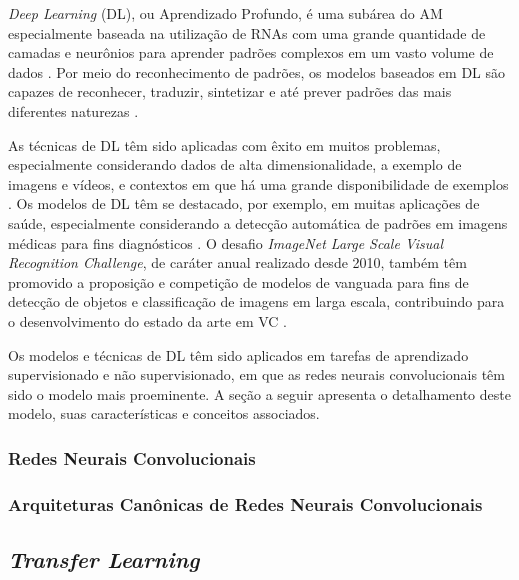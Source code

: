 \emph{Deep Learning} (DL), ou Aprendizado Profundo, é uma subárea do AM especialmente baseada na utilização de RNAs com uma grande quantidade de camadas e neurônios para aprender padrões complexos em um vasto volume de dados \cite{ref:chollet,ref:khan,ref:gulli}. Por meio do reconhecimento de padrões, os modelos baseados em DL são capazes de reconhecer, traduzir, sintetizar e até prever padrões das mais diferentes naturezas \cite{ref:JAI-2017}.

As técnicas de DL têm sido aplicadas com êxito em muitos problemas, especialmente considerando dados de alta dimensionalidade, a exemplo de imagens e vídeos, e contextos em que há uma grande disponibilidade de exemplos  \cite{ref:JAI-2017,ref:khan}. Os modelos de DL têm se destacado, por exemplo, em muitas aplicações de saúde, especialmente considerando a detecção automática de padrões em imagens médicas para fins diagnósticos \cite{ref:yang}. O desafio
\emph{ImageNet Large Scale Visual Recognition Challenge}, de caráter anual realizado desde 2010, também têm promovido a proposição e competição de modelos de vanguada para fins de detecção de objetos e classificação de imagens em larga escala, contribuindo para o desenvolvimento do estado da arte em VC \cite{ref:image-net}.

Os modelos e técnicas de DL têm sido aplicados em tarefas de aprendizado supervisionado e não supervisionado, em que as redes neurais convolucionais têm sido o modelo mais proeminente. A seção a seguir apresenta o detalhamento deste modelo, suas características e conceitos associados.

\subsubsection{Redes Neurais Convolucionais} \label{subsec:cnn}


\subsubsection{Arquiteturas Canônicas de Redes Neurais Convolucionais} \label{subsubsec:arquiteturas}


\subsection{\textit{Transfer Learning}} \label{subsec:transfer}


